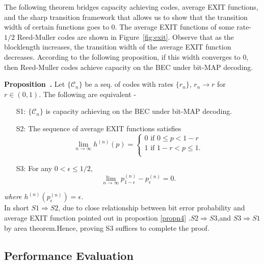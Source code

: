 \documentclass[
11pt, %
a4paper, %
oneside, %
headinclude,footinclude, %
BCOR5mm, %
]{scrartcl}
\newenvironment{proposition}[1][]{\refstepcounter{definition}\par\medskip
   \noindent \textbf{Proposition~\thedefinition. #1} \rmfamily}{\medskip}
\begin{document}
The following theorem bridges capacity achieving codes, average EXIT functions, and the sharp transition framework that allows us to show that the transition width of certain functions goes to $0$. The average EXIT functions of some rate-$1/2$ Reed-Muller codes are shown in Figure~\ref{fig:exit}. Observe that as the blocklength increases, the transition width of the average EXIT function decreases. According to the following proposition, if this width converges to $0$, then Reed-Muller codes achieve capacity on the BEC under bit-MAP decoding.
\begin{proposition}
Let $\{\mathcal{C}_n\}$ be a seq. of codes with rates $\{r_n\}$, $r_n \to r$ for $r \in (0,1)$. The following are equivalent -
\begin{enumerate}
\item[S1:] $\{\mathcal{C}_n\}$ is capacity achieving on the BEC under bit-MAP decoding.
\item[S2:] The sequence of average EXIT functions satisfies
\[
    \lim_{n \to \infty} h^{(n)}(p)=\left\{
                \begin{array}{ll}
                  0 \text{ if } 0 \le p < 1-r\\
                  1 \text{ if } 1-r < p \le 1.\\
                \end{array}
              \right.
  \]
\item[S3:] For any $0 < \epsilon \le 1/2$, $$\lim_{n \to \infty} p_{1-\epsilon}^{(n)} - p_{\epsilon}^{(n)} = 0.$$
\end{enumerate}
\label{propn11}
\end{proposition}
\emph{where $h^{(n)}(p_{\epsilon}^{(n)})=\epsilon$.}\\
In short $S1\Rightarrow S2$, due to close relationship between bit error probability and average EXIT function pointed out in propostion \ref{propn4} .$S2\Rightarrow S3$,and $S3\Rightarrow S1$ by area theorem.Hence, proving S3 suffices to complete the proof.
\subsection{Performance Evaluation}

\newpage
\end{document}
